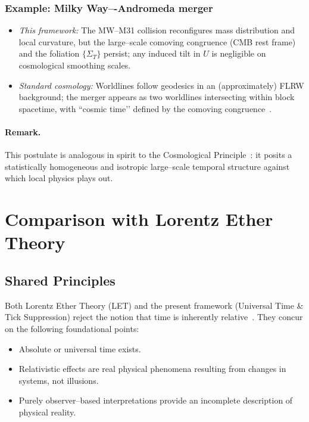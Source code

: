\documentclass[12pt]{article}
\theoremstyle{plain}
\begin{document}
\subsubsection*{Example: Milky Way–-Andromeda merger}
\begin{itemize}
  \item \emph{This framework:} The MW–M31 collision reconfigures mass distribution and local curvature, but the large–scale comoving congruence (CMB rest frame) and the foliation \(\{\Sigma_T\}\) persist; any induced tilt in \(U\) is negligible on cosmological smoothing scales.
  \item \emph{Standard cosmology:} Worldlines follow geodesics in an (approximately) FLRW background; the merger appears as two worldlines intersecting within block spacetime, with “cosmic time’’ defined by the comoving congruence~\cite{Rindler2006}.
\end{itemize}

\paragraph{Remark.}
This postulate is analogous in spirit to the Cosmological Principle~\cite{Rindler2006}: it posits a statistically homogeneous and isotropic large–scale temporal structure against which local physics plays out.

\section{Comparison with Lorentz Ether Theory}
\label{sec:comparison-with-LET}
\subsection{Shared Principles}

Both Lorentz Ether Theory (LET) and the present framework (Universal Time \& Tick Suppression) reject the notion that time is inherently relative~\cite{Lorentz1904}. They concur on the following foundational points:

\begin{itemize}
  \item Absolute or universal time exists.
  \item Relativistic effects are real physical phenomena resulting from changes in systems, not illusions.
  \item Purely observer–based interpretations provide an incomplete description of physical reality.
\end{itemize}
\end{document}
